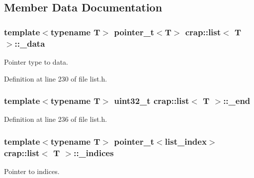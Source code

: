 \subsection{Member Data Documentation}
\hypertarget{classcrap_1_1list_af2d97cc0bbfc61a2c087c58e682b8336}{}
\subsubsection[{\+\_\+data}]{\setlength{\rightskip}{0pt plus 5cm}template$<$typename T$>$ {\bf pointer\+\_\+t}$<$T$>$ {\bf crap\+::list}$<$ T $>$\+::\+\_\+data\hspace{0.3cm}{\ttfamily [protected]}}\label{classcrap_1_1list_af2d97cc0bbfc61a2c087c58e682b8336}


Pointer type to data. 



Definition at line 230 of file list.\+h.

\hypertarget{classcrap_1_1list_a787116724be64ac6cfd3dd47ea90f13c}{}
\subsubsection[{\+\_\+end}]{\setlength{\rightskip}{0pt plus 5cm}template$<$typename T$>$ uint32\+\_\+t {\bf crap\+::list}$<$ T $>$\+::\+\_\+end\hspace{0.3cm}{\ttfamily [protected]}}\label{classcrap_1_1list_a787116724be64ac6cfd3dd47ea90f13c}


Definition at line 236 of file list.\+h.

\hypertarget{classcrap_1_1list_a2875e0226ccb2e4c5a74e33073bfdc6f}{}
\subsubsection[{\+\_\+indices}]{\setlength{\rightskip}{0pt plus 5cm}template$<$typename T$>$ {\bf pointer\+\_\+t}$<${\bf list\+\_\+index}$>$ {\bf crap\+::list}$<$ T $>$\+::\+\_\+indices\hspace{0.3cm}{\ttfamily [protected]}}\label{classcrap_1_1list_a2875e0226ccb2e4c5a74e33073bfdc6f}


Pointer to indices. 



